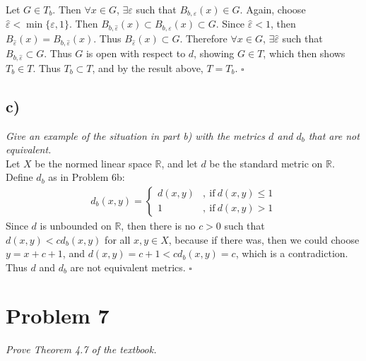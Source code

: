 \documentclass[12pt]{article}
\theoremstyle{plain}
\begin{document}
Let $G \in T_b$.  Then $\forall x \in G$, $\exists \varepsilon$ such that $B_{b,\varepsilon}(x) \in G$.  Again, choose $\hat{\varepsilon} < \min\{\varepsilon, 1\}$.  Then $B_{b,\hat{\varepsilon}}(x) \subset B_{b,\varepsilon}(x) \subset G$.  Since $\hat{\varepsilon} < 1$, then $B_{\hat{\varepsilon}}(x) = B_{b,\hat{\varepsilon}}(x)$.  Thus $B_{\hat{\varepsilon}}(x) \subset G$.  Therefore $\forall x\in G$, $\exists \hat{\varepsilon}$ such that $B_{b,\hat{\varepsilon}} \subset G$.  Thus $G$ is open with respect to $d$, showing $G \in T$, which then shows $T_b \in T$.  Thus $T_b \subset T$, and by the result above, $T = T_b$. \hfill $\square$

\subsection*{ c)}
\emph{Give an example of the situation in part b) with the metrics $d$ and $d_b$ that are \emph{not} equivalent.} \\

Let $X$ be the normed linear space $\mathbb{R}$, and let $d$ be the standard metric on $\mathbb{R}$.  Define $d_b$ as in Problem 6b:
\begin{align*}
    d_b(x,y) = \left\{\begin{array}{ll}
        d(x,y) &,\ \text{if}\ d(x,y) \leq 1 \\
        1 &,\ \text{if}\ d(x,y) > 1
    \end{array}\right.
\end{align*}
Since $d$ is unbounded on $\mathbb{R}$, then there is no $c > 0$ such that $d(x,y) < cd_b(x,y)$ for all $x,y \in X$, because if there was, then we could choose $y = x + c + 1$, and $d(x,y) = c + 1 <cd_b(x,y) = c$, which is a contradiction.  Thus $d$ and $d_b$ are not equivalent metrics. \hfill $\square$

\section*{Problem 7}
\emph{Prove Theorem 4.7 of the textbook.}
\end{document}
